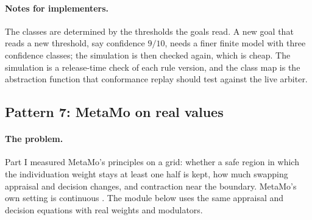 \documentclass[11pt]{article}
\theoremstyle{definition}
\theoremstyle{plain}
\begin{document}
\paragraph{Notes for implementers.} The classes are determined by the thresholds the goals read. A
new goal that reads a new threshold, say confidence $9/10$, needs a finer finite model with three
confidence classes; the simulation is then checked again, which is cheap. The simulation is a
release-time check of each rule version, and the class map is the abstraction function that
conformance replay should test against the live arbiter.

\subsection{Pattern 7: MetaMo on real values}\label{sec:lp7}

\paragraph{The problem.} Part I measured MetaMo's principles on a grid: whether a safe region in
which the individuation weight stays at least one half is kept, how much swapping appraisal and
decision changes, and contraction near the boundary. MetaMo's own setting is continuous
\cite{metamo1,metamo2}. The module below uses the same appraisal and decision equations with real
weights and modulators.
\end{document}
